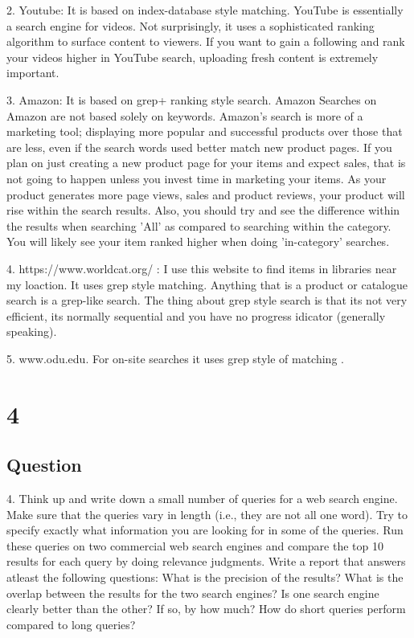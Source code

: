 \documentclass[letterpaper,11pt]{article}
\begin{document}
2. Youtube: It is based on index-database style matching. YouTube is essentially a search engine for videos. Not surprisingly, it uses a sophisticated ranking algorithm to surface content to viewers. If you want to gain a following and rank your videos higher in YouTube search, uploading fresh content is extremely important.

3. Amazon: It is based on grep+ ranking style search. Amazon Searches on Amazon are not based solely on keywords. Amazon's search is more of a marketing tool; displaying more popular and successful products over those that are less, even if the search words used better match new product pages. If you plan on just creating a new product page for your items and expect sales, that is not going to happen unless you invest time in marketing your items. As your product generates more page views, sales and product reviews, your product will rise within the search results. Also, you should try and see the difference within the results when searching 'All' as compared to searching within the category. You will likely see your item ranked higher when doing 'in-category' searches.

4. https://www.worldcat.org/ : I use this website to find items in libraries near my loaction. It uses grep style matching. Anything that is a product or catalogue search is a grep-like search.  The thing about grep style search is that its not very efficient, its normally sequential and you have no progress idicator (generally speaking).

5. www.odu.edu. For on-site searches it uses grep style of matching .


\clearpage



\section*{4}

\subsection*{Question}


4. Think up and write down a small number of queries for a web search engine. Make sure that the queries vary in length (i.e., they are not all one word). Try to specify exactly what information you are looking for in some of the queries. Run these queries on two commercial web search engines and compare the top 10 results for each query by doing relevance judgments. Write a report that answers atleast the following questions: What is the precision of the results? What is the overlap between the results for the two search engines? Is one search engine clearly better than the other? If so, by how much? How do short queries perform compared to long queries?  
\end{document}

